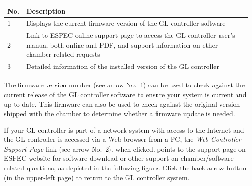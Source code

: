 \begin{longtable}[]{@{}|l|l|@{}}
\toprule
\rowcolor{brown}\begin{minipage}[b]{0.13\columnwidth}\raggedright
{\bf{No.}}\strut
\end{minipage} & \begin{minipage}[b]{0.81\columnwidth}\raggedright
{\bf{Description}}\strut
\end{minipage}\tabularnewline
\midrule
\endhead
\begin{minipage}[t]{0.13\columnwidth}\raggedright
1\strut
\end{minipage} & \begin{minipage}[t]{0.81\columnwidth}\raggedright
Displays the current firmware version of the GL controller
software\strut
\end{minipage}\tabularnewline
\begin{minipage}[t]{0.13\columnwidth}\raggedright
2\strut
\end{minipage} & \begin{minipage}[t]{0.81\columnwidth}\raggedright
Link to ESPEC online support page to access the GL controller user's
manual both online and PDF, and support information on other chamber
related requests\strut
\end{minipage}\tabularnewline
\begin{minipage}[t]{0.13\columnwidth}\raggedright
3\strut
\end{minipage} & \begin{minipage}[t]{0.81\columnwidth}\raggedright
Detailed information of the installed version of the GL controller\strut
\end{minipage}\tabularnewline
\bottomrule
\end{longtable}

The firmware version number (see arrow No.~1) can be used to check
against the current release of the GL controller software to ensure your
system is current and up to date. This firmware can also be used to
check against the original version shipped with the chamber to determine
whether a firmware update is needed.

If your GL controller is part of a network system with access to the
Internet and the GL controller is accessed via a Web browser from a PC,
the \emph{Web Controller Support Page} link (see arrow No.~2), when
clicked, points to the support page on ESPEC website for software
download or other support on chamber/software related questions, as
depicted in the following figure. Click the back-arrow button (in the
upper-left page) to return to the GL controller system.

